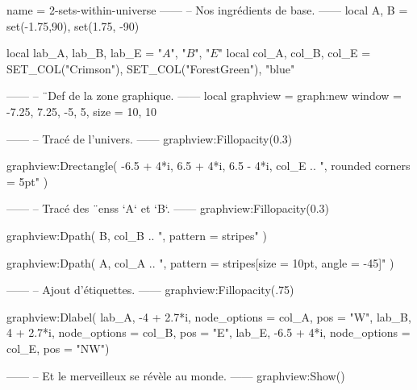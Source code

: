 \documentclass{standalone}
\begin{document}
\begin{luadraw}{name = 2-sets-within-universe}
------
-- Nos ingrédients de base.
------
local A, B = set(-1.75,90), set(1.75, -90)

local lab_A, lab_B, lab_E = "$A$", "$B$", "$E$"
local col_A, col_B, col_E = SET_COL("Crimson"), SET_COL("ForestGreen"), "blue"

------
-- ¨Def de la zone graphique.
------
local graphview = graph:new{
  window = {-7.25, 7.25, -5, 5},
  size   = {10, 10}
}

------
-- Tracé de l'univers.
------
graphview:Fillopacity(0.3)

graphview:Drectangle(
  -6.5 + 4*i, 6.5 + 4*i, 6.5 - 4*i,
  col_E .. ", rounded corners = 5pt"
)

------
-- Tracé des ¨enss `A` et `B`.
------
graphview:Fillopacity(0.3)

graphview:Dpath(
  B,
  col_B .. ", pattern = stripes"
)

graphview:Dpath(
  A,
  col_A .. ", pattern = {stripes[size = 10pt, angle = -45]}"
)

------
-- Ajout d'étiquettes.
------
graphview:Fillopacity(.75)

graphview:Dlabel(
  lab_A, -4 + 2.7*i, {node_options = col_A, pos = "W"},
  lab_B,  4 + 2.7*i, {node_options = col_B, pos = "E"},
  lab_E, -6.5 + 4*i, {node_options = col_E, pos = "NW"})

------
-- Et le merveilleux se révèle au monde.
------
graphview:Show()
\end{luadraw}
\end{document}
